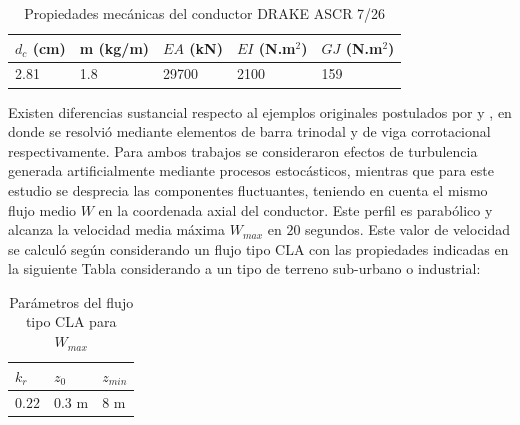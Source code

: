 \begin{table}[ht!]
	\begin{center}
		\begin{tabular}{ | m{2cm} | m{2cm} | m{2cm} | m{2cm} |  m{2cm} | }
			\hline $d_c$ (cm) & m (kg/m)& $EA$ (kN)& $EI$ (N.m$^2$)& $GJ$ (N.m$^2$)  \\ \hline
			2.81 & 1.8 & 29700 &2100 &159   \\ \hline
		\end{tabular}
	\end{center}
	\caption{Propiedades mecánicas del conductor DRAKE ASCR 7/26 }
	\label{table:RN:FotiCable:propiedadesCable}
\end{table}

Existen diferencias sustancial respecto al ejemplos originales postulados por \cite{luongo1998non} y \cite{martinelli2001numerical}, en donde se resolvió mediante elementos de barra trinodal y de viga corrotacional respectivamente. Para ambos trabajos se consideraron efectos de turbulencia generada artificialmente mediante procesos estocásticos, mientras que para este estudio se desprecia las componentes fluctuantes, teniendo en cuenta el mismo flujo medio $W$  en la coordenada axial del conductor. Este perfil es parabólico y alcanza la velocidad media máxima $W_{max}$ en $20$ segundos. Este valor de velocidad se calculó según \cite{IEC60826} considerando un flujo tipo CLA con las propiedades indicadas en la siguiente Tabla considerando a un tipo de terreno sub-urbano o industrial:


\begin{table}[htbp]
	\begin{center}
		\begin{tabular}{ | m{2cm} | m{2cm} | m{2cm} | }
			\hline $k_r$ & $z_0$& $z_{min}$  \\ \hline
			$0.22$ &$0.3$ m & $8$ m     \\ \hline
		\end{tabular}
	\end{center}
	\caption{Parámetros del flujo tipo CLA para $W_{max}$ }
	\label{table:RN:propiedadesFlujo}
\end{table}

